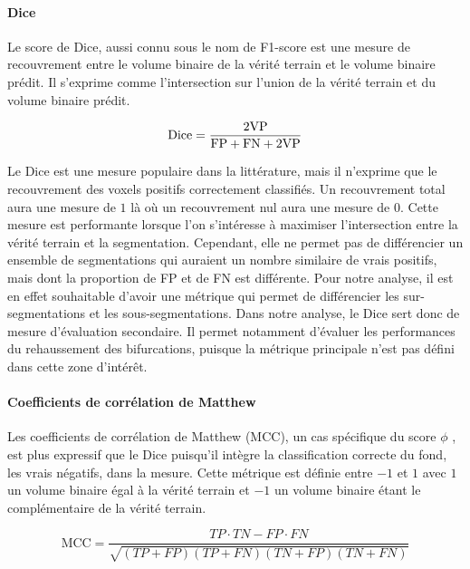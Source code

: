 \paragraph{Dice}

Le score de Dice, aussi connu sous le nom de F1-score est une mesure de recouvrement entre le volume binaire de la vérité terrain et le volume binaire prédit. Il s'exprime comme l'intersection sur l'union de la vérité terrain et du volume binaire prédit.

\begin{equation}
  \textrm{Dice} = \frac{2 \textrm{VP}}{\textrm{FP} + \textrm{FN} + 2 \textrm{VP}} \\ 
\end{equation}

Le Dice est une mesure populaire dans la littérature, mais il n'exprime que le recouvrement des voxels positifs correctement classifiés. Un recouvrement total aura une mesure de $1$ là où un recouvrement nul aura une mesure de $0$. Cette mesure est performante lorsque l'on s'intéresse à maximiser l'intersection entre la vérité terrain et la segmentation. Cependant, elle ne permet pas de différencier un ensemble de segmentations qui auraient un nombre similaire de vrais positifs, mais dont la proportion de FP et de FN est différente. Pour notre analyse, il est en effet souhaitable d'avoir une métrique qui permet de différencier les sur-segmentations et les sous-segmentations. Dans notre analyse, le Dice sert donc de mesure d'évaluation secondaire. Il permet notamment d'évaluer les performances du rehaussement des bifurcations, puisque la métrique principale n'est pas défini dans cette zone d'intérêt.

\paragraph{Coefficients de corrélation de Matthew}

Les coefficients de corrélation de Matthew (MCC), un cas spécifique du score $\phi$ \cite{Chicco2020_advantages_MCC_Dice}, est plus  expressif que le Dice puisqu'il intègre la classification correcte du fond, les vrais négatifs, dans la mesure. Cette métrique est définie entre $-1$ et $1$ avec $1$ un volume binaire égal à la vérité terrain et $-1$ un volume binaire étant le complémentaire de la vérité terrain.

\begin{equation}
  \textrm{MCC} = \frac{TP \cdot TN - FP \cdot FN}{\sqrt{(TP+FP)(TP+FN)(TN+FP)(TN+FN)}}
\end{equation}

